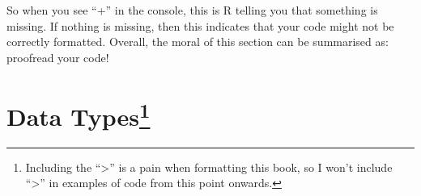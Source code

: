 \documentclass[
]{book}
\begin{document}
So when you see ``+'' in the console, this is R telling you that something is missing. If nothing is missing, then this indicates that your code might not be correctly formatted. Overall, the moral of this section can be summarised as: proofread your code!

\hypertarget{data-types03-programming_p1-1}{%
\section[Data Types]{\texorpdfstring{Data Types\footnote{Including the ``\textgreater{}'' is a pain when formatting this book, so I won't include ``\textgreater{}'' in examples of code from this point onwards.}}{Data Types}}\label{data-types03-programming_p1-1}}

  
\end{document}
